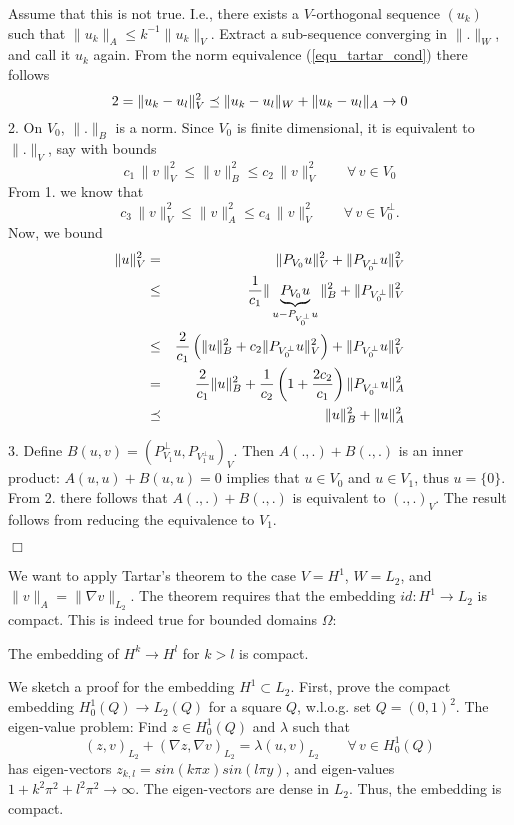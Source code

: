 Assume that this is not true. I.e., there exists a $V$-orthogonal sequence 
$(u_k)$ such that $\| u_k \|_A \leq k^{-1} \| u_k \|_V$. Extract a sub-sequence
converging in $\| . \|_W$, and call it $u_k$ again. From the norm
equivalence (\ref{equ_tartar_cond}) there follows
$$
2 = \| u_k - u_l \|_V^2 \preceq \| u_k - u_l \|_W + \| u_k - u_l \|_A \rightarrow 0
$$
2. On $V_0$, $\| . \|_B$ is a norm. Since $V_0$ is finite dimensional, it
is equivalent to $\|.\|_V$, say with bounds
$$
c_1 \, \| v \|_{V}^2 \leq \| v \|_B^2 \leq c_2 \, \| v \|_V^2 \qquad \forall \, v \in V_0
$$
From 1. we know that
$$
c_3 \, \| v \|_V^2 \leq \| v \|_A^2 \leq c_4 \, \| v \|_V^2 \qquad \forall \, v \in V_0^\bot.
$$
Now, we bound
\begin{eqnarray*}
\| u \|_V^2 & = & \| P_{V_0} u \|_V^2 + \| P_{V_0^\bot} u \|_V^2 \\
        & \leq & \frac{1}{c_1} \| \underbrace{P_{V_0} u }_{u - P_{V_0^\bot} u } \|_B^2 + \| P_{V_0^\bot} \|_V^2 \\
        & \leq & \frac{2}{c_1} \left( \| u \|_B^2 + c_2 \| P_{V_0^\bot} u \|_V^2 \right) + \| P_{V_0^\bot} u \|_V^2 \\
        & = & \frac{2}{c_1} \| u \|_B^2 + \frac{1}{c_2} \left(1 + \frac{2 c_2}{c_1} \right) \| P_{V_0^\bot} u \|_A^2 \\
        & \preceq & \| u \|_B^2 + \| u \|_A^2
\end{eqnarray*}

3. Define $B(u,v) = (P_{V_1}^\bot u, P_{V_1^\bot u})_V$. Then $A(.,.)+B(.,.)$
is an inner product: $A(u,u)+B(u,u) = 0$ implies that $u \in V_0$ and $u \in V_1$, thus $u = \{ 0 \}$. From 2. there follows that $A(.,.)+B(.,.)$ is
equivalent to $(.,.)_V$. The result follows from reducing the equivalence 
to $V_1$.

\hfill $\Box$

We want to apply Tartar's theorem to the case $V = H^1$, $W = L_2$,
and $\|v \|_A = \| \nabla v \|_{L_2}$.
The theorem requires that the embedding $id : H^1 \rightarrow L_2$ is
compact. This is indeed true for bounded domains $\Omega$:

\begin{theorem} The embedding of $H^k \rightarrow H^l$ for $k > l$ is 
compact.
\end{theorem}
We sketch a proof for the embedding $H^1 \subset L_2$.
First, prove the compact embedding $H_0^1(Q) \rightarrow L_2(Q)$ for
a square $Q$, w.l.o.g. set $Q = (0,1)^2$. 
The eigen-value problem: Find $z \in H_0^1(Q)$ and $\lambda$ such that
$$
(z,v)_{L_2} + (\nabla z, \nabla v)_{L_2} = \lambda (u,v)_{L_2} \qquad 
\forall \, v \in H_0^1(Q)
$$
has eigen-vectors $z_{k,l} = sin (k \pi x) sin (l \pi y)$, and eigen-values
$1+k^2 \pi^2 + l^2 \pi^2 \rightarrow \infty$. The eigen-vectors are dense 
in $L_2$. Thus, the embedding is compact.

